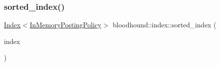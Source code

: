 \subsubsection{\texorpdfstring{sorted\+\_\+index()}{sorted\_index()}}
{\footnotesize\ttfamily \mbox{\hyperlink{classbloodhound_1_1index_1_1Index}{Index}}$<$\mbox{\hyperlink{classbloodhound_1_1index_1_1InMemoryPostingPolicy}{In\+Memory\+Posting\+Policy}}$>$ bloodhound\+::index\+::sorted\+\_\+index (\begin{DoxyParamCaption}\item[{const \mbox{\hyperlink{classbloodhound_1_1index_1_1Index}{Index}}$<$ \mbox{\hyperlink{classbloodhound_1_1index_1_1InMemoryPostingPolicy}{In\+Memory\+Posting\+Policy}} $>$ \&}]{index }\end{DoxyParamCaption})}

